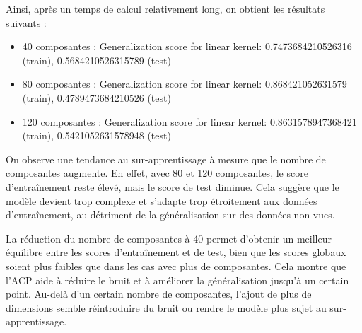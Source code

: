 \documentclass{scrartcl}
\begin{document}
Ainsi, après un temps de calcul relativement long, on obtient les résultats suivants :
\begin{itemize}
    \item 40 composantes : Generalization score for linear kernel: 0.7473684210526316 (train), 0.5684210526315789 (test) 
    \item 80 composantes : Generalization score for linear kernel: 0.868421052631579 (train), 0.4789473684210526 (test) 
    \item 120 composantes : Generalization score for linear kernel: 0.8631578947368421 (train), 0.5421052631578948 (test) 
\end{itemize}

On observe une tendance au sur-apprentissage à mesure que le nombre de composantes augmente. En effet, avec 80 et 120 composantes, le score d'entraînement reste élevé, mais le score de test diminue. Cela suggère que le modèle devient trop complexe et s'adapte trop étroitement aux données d'entraînement, au détriment de la généralisation sur des données non vues.
\newline

La réduction du nombre de composantes à 40 permet d'obtenir un meilleur équilibre entre les scores d'entraînement et de test, bien que les scores globaux soient plus faibles que dans les cas avec plus de composantes. Cela montre que l'ACP aide à réduire le bruit et à améliorer la généralisation jusqu'à un certain point. Au-delà d'un certain nombre de composantes, l'ajout de plus de dimensions semble réintroduire du bruit ou rendre le modèle plus sujet au sur-apprentissage.
\end{document}
